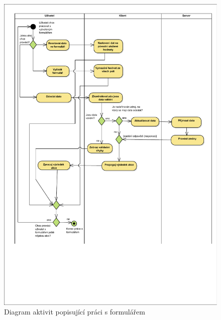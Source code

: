 \begin{figure}
\begin{center}
\includegraphics{figures/formWorkActivityDiagram}
\caption{Diagram aktivit popisující práci s formulářem}
\label{img:formWorkActivityDiagram}
\end{center}
\end{figure}

